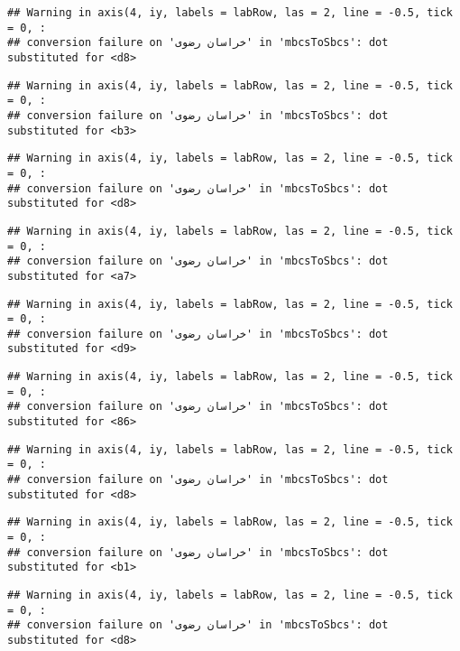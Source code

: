 \documentclass[
]{article}
\begin{document}
\begin{verbatim}
## Warning in axis(4, iy, labels = labRow, las = 2, line = -0.5, tick = 0, :
## conversion failure on 'خراسان رضوی' in 'mbcsToSbcs': dot substituted for <d8>
\end{verbatim}

\begin{verbatim}
## Warning in axis(4, iy, labels = labRow, las = 2, line = -0.5, tick = 0, :
## conversion failure on 'خراسان رضوی' in 'mbcsToSbcs': dot substituted for <b3>
\end{verbatim}

\begin{verbatim}
## Warning in axis(4, iy, labels = labRow, las = 2, line = -0.5, tick = 0, :
## conversion failure on 'خراسان رضوی' in 'mbcsToSbcs': dot substituted for <d8>
\end{verbatim}

\begin{verbatim}
## Warning in axis(4, iy, labels = labRow, las = 2, line = -0.5, tick = 0, :
## conversion failure on 'خراسان رضوی' in 'mbcsToSbcs': dot substituted for <a7>
\end{verbatim}

\begin{verbatim}
## Warning in axis(4, iy, labels = labRow, las = 2, line = -0.5, tick = 0, :
## conversion failure on 'خراسان رضوی' in 'mbcsToSbcs': dot substituted for <d9>
\end{verbatim}

\begin{verbatim}
## Warning in axis(4, iy, labels = labRow, las = 2, line = -0.5, tick = 0, :
## conversion failure on 'خراسان رضوی' in 'mbcsToSbcs': dot substituted for <86>
\end{verbatim}

\begin{verbatim}
## Warning in axis(4, iy, labels = labRow, las = 2, line = -0.5, tick = 0, :
## conversion failure on 'خراسان رضوی' in 'mbcsToSbcs': dot substituted for <d8>
\end{verbatim}

\begin{verbatim}
## Warning in axis(4, iy, labels = labRow, las = 2, line = -0.5, tick = 0, :
## conversion failure on 'خراسان رضوی' in 'mbcsToSbcs': dot substituted for <b1>
\end{verbatim}

\begin{verbatim}
## Warning in axis(4, iy, labels = labRow, las = 2, line = -0.5, tick = 0, :
## conversion failure on 'خراسان رضوی' in 'mbcsToSbcs': dot substituted for <d8>
\end{verbatim}
\end{document}
